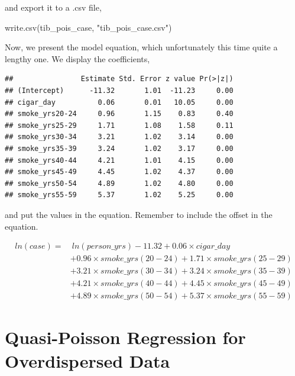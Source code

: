 \documentclass[
  10pt,
]{krantz}
\newenvironment{Shaded}{\begin{snugshade}}{\end{snugshade}}
\newcommand{\DecValTok}[1]{\textcolor[rgb]{0.00,0.00,0.81}{#1}}
\newcommand{\FunctionTok}[1]{\textcolor[rgb]{0.00,0.00,0.00}{#1}}
\newcommand{\NormalTok}[1]{#1}
\newcommand{\SpecialCharTok}[1]{\textcolor[rgb]{0.00,0.00,0.00}{#1}}
\newcommand{\StringTok}[1]{\textcolor[rgb]{0.31,0.60,0.02}{#1}}
\begin{document}
and export it to a .csv file,

\begin{Shaded}
\begin{Highlighting}[]
\FunctionTok{write.csv}\NormalTok{(tib\_pois\_case, }\StringTok{"tib\_pois\_case.csv"}\NormalTok{)}
\end{Highlighting}
\end{Shaded}

Now, we present the model equation, which unfortunately this time quite a lengthy one. We display the coefficients,

\begin{Shaded}
\end{Shaded}

\begin{verbatim}
##                Estimate Std. Error z value Pr(>|z|)
## (Intercept)      -11.32       1.01  -11.23     0.00
## cigar_day          0.06       0.01   10.05     0.00
## smoke_yrs20-24     0.96       1.15    0.83     0.40
## smoke_yrs25-29     1.71       1.08    1.58     0.11
## smoke_yrs30-34     3.21       1.02    3.14     0.00
## smoke_yrs35-39     3.24       1.02    3.17     0.00
## smoke_yrs40-44     4.21       1.01    4.15     0.00
## smoke_yrs45-49     4.45       1.02    4.37     0.00
## smoke_yrs50-54     4.89       1.02    4.80     0.00
## smoke_yrs55-59     5.37       1.02    5.25     0.00
\end{verbatim}

and put the values in the equation. Remember to include the offset in the equation.

\[\begin{aligned}
ln(case) = &\ ln(person\_yrs) -11.32 + 0.06\times cigar\_day \\
& + 0.96\times smoke\_yrs(20-24) + 1.71\times smoke\_yrs(25-29) \\
& + 3.21\times smoke\_yrs(30-34) + 3.24\times smoke\_yrs(35-39) \\
& + 4.21\times smoke\_yrs(40-44) + 4.45\times smoke\_yrs(45-49) \\
& + 4.89\times smoke\_yrs(50-54) + 5.37\times smoke\_yrs(55-59)
\end{aligned}\]

\hypertarget{quasi-poisson-regression-for-overdispersed-data}{%
\section{\texorpdfstring{Quasi-Poisson Regression for Overdispersed Data}{Quasi-Poisson Regression for Overdispersed Data}}\label{quasi-poisson-regression-for-overdispersed-data}}
\end{document}
